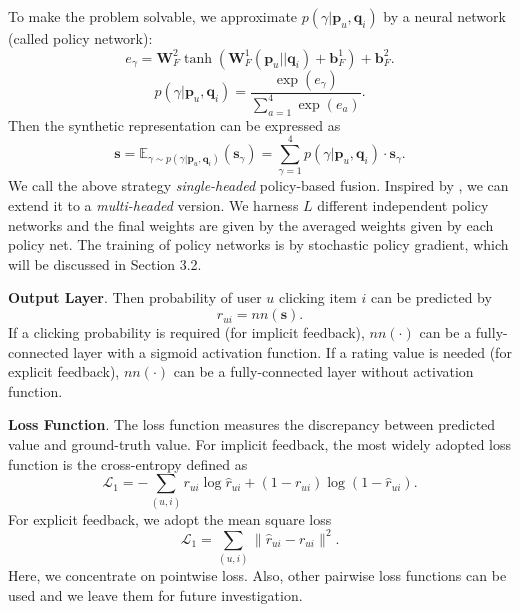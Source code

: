 \documentclass[sigconf]{acmart}
\begin{document}
To make the problem solvable, we approximate $p(\gamma|\mathbf p_u, \mathbf q_i)$ by a neural network (called policy network):
\begin{equation}\nonumber
e_\gamma = \mathbf W^2_F\tanh(\mathbf W^1_F (\mathbf p_u || \mathbf q_i)+\mathbf b^1_F)+\mathbf b^2_F.
\end{equation}
\begin{equation}\nonumber
p(\gamma|\mathbf p_u, \mathbf q_i) = \frac{\exp(e_\gamma)}{\sum_{a=1}^4 \exp(e_a)}.
\end{equation}
Then the synthetic representation can be expressed as
\begin{equation}\nonumber
\mathbf s = \mathbb E_{\gamma\sim p(\gamma|\mathbf p_u, \mathbf q_i)}(\mathbf s_\gamma)=\sum\limits_{\gamma=1}^4 p(\gamma|\mathbf p_u, \mathbf q_i)\cdot \mathbf s_\gamma.
\end{equation}
We call the above strategy {\it single-headed} policy-based fusion. 
Inspired by \cite{AIAYN}, we can extend it to a {\it multi-headed} version. 
We harness $L$ different independent policy networks and the final weights are given by the averaged weights given by each policy net. The training of policy networks is by stochastic policy gradient, which will be discussed in Section 3.2.

\textbf{Output Layer}. Then probability of user $u$ clicking item $i$ can be predicted by
\begin{equation}\nonumber
\hat r_{ui} = nn(\mathbf s).
\end{equation}
If a clicking probability is required (for implicit feedback), $nn(\cdot)$ can be a fully-connected layer with a sigmoid activation function. 
If a rating value is needed (for explicit feedback), $nn(\cdot)$ can be a fully-connected layer without activation function. 

\textbf{Loss Function}. The loss function measures the discrepancy between predicted value and ground-truth value. For implicit feedback, the most widely adopted loss function is the cross-entropy defined as
\begin{equation}\nonumber
\mathcal L_1=-\sum\limits_{(u,i)}r_{ui}\log \hat r_{ui}+(1-r_{ui})\log (1-\hat r_{ui}).
\end{equation}
For explicit feedback, we adopt the mean square loss
\begin{equation}\nonumber
\mathcal L_1=\sum\limits_{(u,i)}\|\hat r_{ui}-r_{ui}\|^2.
\end{equation}
Here, we concentrate on pointwise loss. Also, other pairwise loss functions can be used and we leave them for future investigation.
\end{document}
